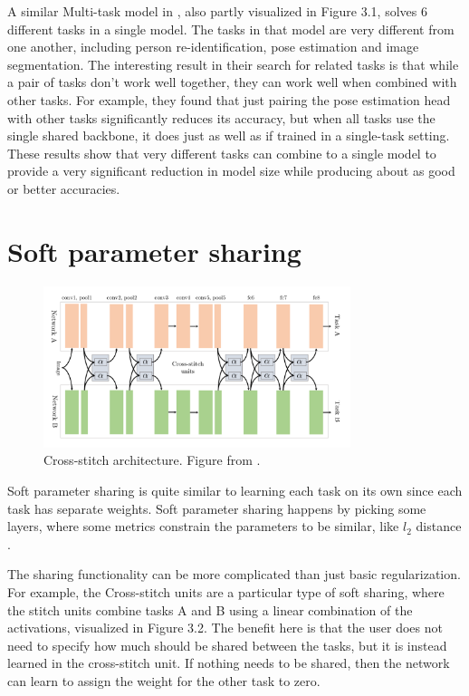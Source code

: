 A similar Multi-task model in \citep{visualPerson}, also partly visualized in Figure 3.1, solves 6 different tasks in a single model.
The tasks in that model are very different from one another, including person re-identification, pose estimation and image segmentation.
The interesting result in their search for related tasks is that while a pair of tasks don't work well together, they can work well when combined with other tasks.
For example, they found that just pairing the pose estimation head with other tasks significantly reduces its accuracy, but when all tasks use the single shared backbone, it does just as well as if trained in a single-task setting.
These results show that very different tasks can combine to a single model to provide a very significant reduction in model size while producing about as good or better accuracies.

\section{Soft parameter sharing}

\begin{figure}[h!]
    \centering
    \includegraphics[width=0.8\textwidth]{imgs/stitch.png}
    \caption{Cross-stitch architecture. Figure from \citep{crossStitch}.\label{fig:params}}
\end{figure}

Soft parameter sharing is quite similar to learning each task on its own since each task has separate weights.
Soft parameter sharing happens by picking some layers, where some metrics constrain the parameters to be similar, like ${l_2}$ distance \citep{ruderOverview}.

The sharing functionality can be more complicated than just basic regularization.
For example, the Cross-stitch units \citep{crossStitch} are a particular type of soft sharing, where the stitch units combine tasks A and B using a linear combination of the activations, visualized in Figure 3.2.
The benefit here is that the user does not need to specify how much should be shared between the tasks, but it is instead learned in the cross-stitch unit.
If nothing needs to be shared, then the network can learn to assign the weight for the other task to zero.

